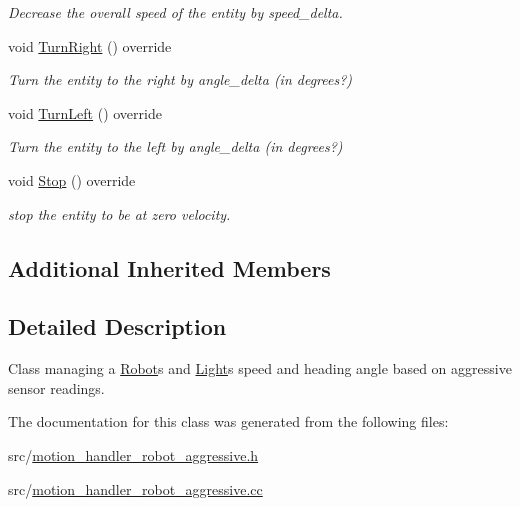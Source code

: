 \begin{DoxyCompactItemize}
\begin{DoxyCompactList}\small\item\em Decrease the overall speed of the entity by speed\+\_\+delta. \end{DoxyCompactList}\item 
void \hyperlink{class_motion_handler_robot_aggressive_a848029187d0e50d64a2a1b91a0f7c541}{Turn\+Right} () override\hypertarget{class_motion_handler_robot_aggressive_a848029187d0e50d64a2a1b91a0f7c541}{}\label{class_motion_handler_robot_aggressive_a848029187d0e50d64a2a1b91a0f7c541}

\begin{DoxyCompactList}\small\item\em Turn the entity to the right by angle\+\_\+delta (in degrees?) \end{DoxyCompactList}\item 
void \hyperlink{class_motion_handler_robot_aggressive_a67f0e31a85f979273896433ddfb38a61}{Turn\+Left} () override\hypertarget{class_motion_handler_robot_aggressive_a67f0e31a85f979273896433ddfb38a61}{}\label{class_motion_handler_robot_aggressive_a67f0e31a85f979273896433ddfb38a61}

\begin{DoxyCompactList}\small\item\em Turn the entity to the left by angle\+\_\+delta (in degrees?) \end{DoxyCompactList}\item 
void \hyperlink{class_motion_handler_robot_aggressive_a8c4e7489817fb53fda12a17bc044d76b}{Stop} () override\hypertarget{class_motion_handler_robot_aggressive_a8c4e7489817fb53fda12a17bc044d76b}{}\label{class_motion_handler_robot_aggressive_a8c4e7489817fb53fda12a17bc044d76b}

\begin{DoxyCompactList}\small\item\em stop the entity to be at zero velocity. \end{DoxyCompactList}\end{DoxyCompactItemize}
\subsection*{Additional Inherited Members}


\subsection{Detailed Description}
Class managing a \hyperlink{class_robot}{Robot}\textquotesingle{}s and \hyperlink{class_light}{Light}\textquotesingle{}s speed and heading angle based on aggressive sensor readings. 

The documentation for this class was generated from the following files\+:\begin{DoxyCompactItemize}
\item 
src/\hyperlink{motion__handler__robot__aggressive_8h}{motion\+\_\+handler\+\_\+robot\+\_\+aggressive.\+h}\item 
src/\hyperlink{motion__handler__robot__aggressive_8cc}{motion\+\_\+handler\+\_\+robot\+\_\+aggressive.\+cc}\end{DoxyCompactItemize}
